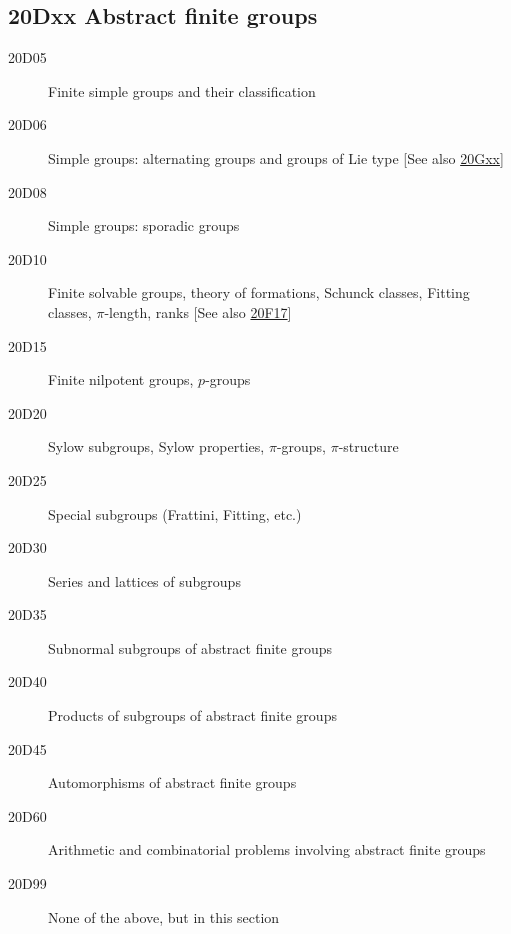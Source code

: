 \documentclass[letterpaper]{article}
\begin{document}
\subsection*{20Dxx  Abstract finite groups }\label{20Dxx}
\begin{description}
\item [20D05]\label{20D05} Finite simple groups and their classification
\item [20D06]\label{20D06} Simple groups: alternating groups and groups of Lie type [See also \hyperref[20Gxx]{20Gxx}]
\item [20D08]\label{20D08} Simple groups: sporadic groups
\item [20D10]\label{20D10} Finite solvable groups, theory of formations, Schunck classes, Fitting classes, $\pi$-length, ranks [See also \hyperref[20F17]{20F17}]
\item [20D15]\label{20D15} Finite nilpotent groups, $p$-groups
\item [20D20]\label{20D20} Sylow subgroups, Sylow properties, $\pi$-groups, $\pi$-structure
\item [20D25]\label{20D25} Special subgroups (Frattini, Fitting, etc.)
\item [20D30]\label{20D30} Series and lattices of subgroups
\item [20D35]\label{20D35} Subnormal subgroups of abstract finite groups 
\item [20D40]\label{20D40} Products of subgroups of abstract finite groups 
\item [20D45]\label{20D45} Automorphisms of abstract finite groups 
\item [20D60]\label{20D60} Arithmetic and combinatorial problems involving abstract finite groups
\item [20D99]\label{20D99} None of the above, but in this section
\end{description}
\end{document}
